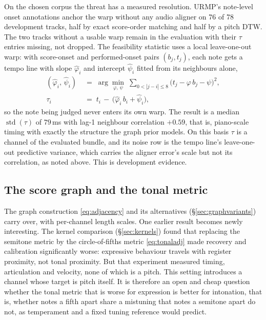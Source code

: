 On the chosen corpus the threat has a measured resolution. URMP's
note-level onset annotations anchor the warp without any audio aligner on
76 of 78 development tracks, half by exact score-order matching and half
by a pitch DTW. The two tracks without a usable warp remain in the
evaluation with their $\tau$ entries missing, not dropped. The
feasibility statistic uses a local leave-one-out warp: with score-onset
and performed-onset pairs $(b_j, t_j)$, each note gets a tempo line with
slope $\hat\varphi_i$ and intercept $\hat\psi_i$ fitted from its
neighbours alone,
\begin{align}
  (\hat\varphi_i,\, \hat\psi_i)
  &\;=\; \arg\min_{\varphi,\,\psi}\; \sum_{0 < |j - i| \le 8}
     \bigl(t_j - \varphi\, b_j - \psi\bigr)^2,
  \label{eq:localwarp}\\
  \tau_i &\;=\; t_i \,-\, \bigl(\hat\varphi_i\, b_i + \hat\psi_i\bigr),
  \nonumber
\end{align}
so the note being judged never enters its own warp. The result is a
median $\operatorname{std}(\tau)$ of $79$\,ms with lag-1 neighbour
correlation $+0.59$, that is, piano-scale timing with exactly the
structure the graph prior models. On this basis $\tau$ is a channel of
the evaluated bundle, and its noise row is the tempo line's leave-one-out
predictive variance, which carries the aligner error's scale but not its
correlation, as noted above. This is development evidence.

\subsection{The score graph and the tonal metric}
The graph construction \eqref{eq:adjacency} and its alternatives
(\S\ref{sec:graphvariants}) carry over, with per-channel length scales.
One earlier result becomes newly interesting. The kernel comparison
(\S\ref{sec:kernels}) found that replacing the semitone metric by the
circle-of-fifths metric \eqref{eq:tonaladj} made recovery and calibration
significantly worse: expressive behaviour travels with register
proximity, not tonal proximity. But that experiment measured timing,
articulation and velocity, none of which is a pitch. This setting
introduces a channel whose target is pitch itself. It is therefore an
open and cheap question whether the tonal metric that is worse for
expression is better for intonation, that is, whether notes a fifth apart
share a mistuning that notes a semitone apart do not, as temperament and
a fixed tuning reference would predict.

